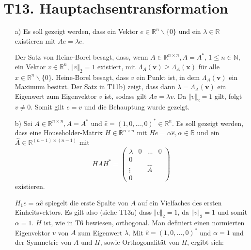 \documentclass[11pt]{article}
\theoremstyle{plain}
\theoremstyle{definition}
\let\mbb\boldsymbol
\renewcommand\boldsymbol{\mbb}
\renewcommand{\a}{\"{a}}
\renewcommand{\u}{\"{u}}
\newcommand{\rayx}{\Lambda_A(\mbb{x})}
\newcommand{\rayv}{\Lambda_A(\mbb{v})}
\begin{document}
\section*{T13. Hauptachsentransformation}
\begin{itemize}
\item[a)]
Es soll gezeigt werden, dass ein Vektor $e\in \mathbb{R}^n \backslash \{0\}$ und ein $\lambda\in \mathbb{R}$ existieren mit $Ae=\lambda e$.

Der Satz von Heine-Borel besagt, dass, wenn  $A \in \mathbb{R}^{n \times n}, A=A^*$, $1 \leq n \in \mathbb{N}$, ein Vektor $v\in  \mathbb{R}^n$, $\Vert v\Vert_2 = 1$ existiert, mit $\rayv \geq \rayx$ f\u r alle $x\in \mathbb{R}^n \backslash \{0\}$. Heine-Borel besagt, dass $v$ ein Punkt ist, in dem $\rayv$ ein Maximum besitzt. Der Satz in T11b) zeigt, dass dann $\lambda = \rayv$ ein Eigenwert zum Eigenvektor $v$ ist, sodass gilt $Av=\lambda v$. Da $\Vert v\Vert_2 = 1$ gilt, folgt $v \neq 0$. Somit gilt $e=v$ und die Behauptung wurde gezeigt. 

\item[b)]
Sei $A \in \mathbb{R}^{n \times n}, A=A^*$ und $\hat{e} = (1, 0, ..., 0)^* \in \mathbb{R}^n$. Es soll gezeigt werden, dass eine Householder-Matrix $H \in \mathbb{R}^{n \times n}$ mit $He=\alpha \hat{e}, \alpha \in \mathbb{R}$ und ein $\hat{A} \in \mathbb{R}^{(n-1) \times (n-1)}$ mit
\begin{equation}
HAH^* =
\left(
\begin{array}{c|ccc}
\lambda & 0 & \hdots & 0    \\\hline
0  & & &                    \\
\vdots & & \hat{A} &        \\
0  & & &
\end{array}
\right)
\end{equation}
existieren.\vspace{0.3cm}

$H_1e = \alpha \hat{e}$ spiegelt die erste Spalte von $A$ auf ein Vielfaches des ersten Einheitsvektors. Es gilt also (siehe T13a) dass $\Vert e \Vert_2 = 1$, da $\Vert v \Vert_2 = 1$ und somit $\alpha=1$. $H$ ist, wie in T6 bewiesen, orthogonal.
Man definiert einen normierten Eigenvektor $v$ von $A$ zum Eigenwert $\lambda$. 
Mit $\hat{e}=(1,0,\hdots,0)^*$ und $\alpha=1$ und der Symmetrie von $A$ und $H$, sowie Orthogonalit\a t von $H$, ergibt sich:


\end{itemize}
\end{document}
